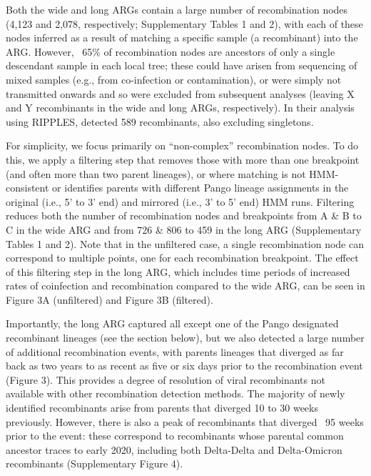 \documentclass{article}
\begin{document}
Both the wide and long ARGs contain a large number of recombination nodes
(4,123 and 2,078, respectively; Supplementary Tables 1 and 2), with each of
these nodes inferred as a result of matching a specific sample (a recombinant)
into the ARG. However, ~65\% of recombination nodes are ancestors of only a
single descendant sample in each local tree; these could have arisen from
sequencing of mixed samples (e.g., from co-infection or contamination), or were
simply not transmitted onwards and so were excluded from subsequent analyses
(leaving X and Y recombinants in the wide and long ARGs, respectively). In
their analysis using RIPPLES, \cite{Turakhia2022-it} detected 589 recombinants,
also excluding singletons.

For simplicity, we focus primarily on ``non-complex'' recombination nodes. To do
this, we apply a filtering step that removes those with more than one
breakpoint (and often more than two parent lineages), or where matching is not
HMM-consistent or identifies parents with different Pango lineage assignments
in the original (i.e., 5’ to 3’ end) and mirrored (i.e., 3’ to 5’ end) HMM
runs. Filtering reduces both the number of recombination nodes and breakpoints
from  A \& B to C in the wide ARG and from 726 \& 806 to 459 in the long ARG
(Supplementary Tables 1 and 2). Note that in the unfiltered case, a single
recombination node can correspond to multiple points, one for each
recombination breakpoint. The effect of this filtering step in the long ARG,
which includes time periods of increased rates of coinfection and recombination
compared to the wide ARG, can be seen in Figure 3A (unfiltered) and Figure 3B
(filtered).

Importantly, the long ARG captured all except one of the Pango designated
recombinant lineages (see the section below), but we also detected a large
number of additional recombination events, with parents lineages that diverged
as far back as two years to as recent as five or six days prior to the
recombination event (Figure 3). This provides a degree of resolution of viral
recombinants not available with other recombination detection methods. The
majority of newly identified recombinants arise from parents that diverged 10
to 30 weeks previously. However, there is also a peak of recombinants that
diverged ~95 weeks prior to the event: these correspond to recombinants whose
parental common ancestor traces to early 2020, including both Delta-Delta and
Delta-Omicron recombinants (Supplementary Figure 4).
\end{document}

